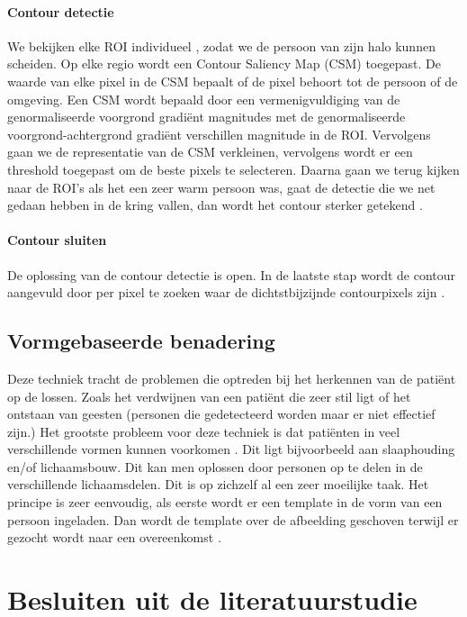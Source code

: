 \paragraph{Contour detectie}
We bekijken elke ROI individueel , zodat we de persoon van zijn halo kunnen scheiden. Op elke regio wordt een Contour Saliency Map (CSM) toegepast. De waarde van elke pixel in de CSM bepaalt of de pixel behoort tot de persoon of de omgeving. Een CSM wordt bepaald door een vermenigvuldiging van de genormaliseerde voorgrond gradi\"ent magnitudes met de genormaliseerde voorgrond-achtergrond gradi\"ent verschillen magnitude in de ROI. Vervolgens gaan we de representatie van de CSM verkleinen, vervolgens wordt er een threshold toegepast om de beste pixels te selecteren. Daarna gaan we terug kijken naar de ROI's als het een zeer warm persoon was, gaat de detectie die we net gedaan hebben in de kring vallen, dan wordt het contour sterker getekend \cite{bibBET5}.

\paragraph{Contour sluiten}
De oplossing van de contour detectie is open. In de laatste stap wordt de contour aangevuld door per pixel te zoeken waar de dichtstbijzijnde contourpixels zijn \cite{bibBET5}.

\subsection{Vormgebaseerde benadering}
\label{refVBB}
Deze techniek tracht de problemen die optreden bij het herkennen van de pati\"ent op de lossen. Zoals het verdwijnen van een pati\"ent die zeer stil ligt of het ontstaan van geesten (personen die gedetecteerd worden maar er niet effectief zijn.) Het grootste probleem voor deze techniek is dat pati\"enten in veel verschillende vormen kunnen voorkomen \cite{bibIRC}. Dit ligt bijvoorbeeld aan slaaphouding en/of lichaamsbouw. Dit kan men oplossen door personen op te delen in de verschillende lichaamsdelen. Dit is op zichzelf al een zeer moeilijke taak.  
Het principe is zeer eenvoudig, als eerste wordt er een template in de vorm van een persoon ingeladen. Dan wordt de template over de afbeelding geschoven terwijl er gezocht wordt naar een overeenkomst \cite{bibIRC4}.

\section{Besluiten uit de literatuurstudie}
\label{refLBe}
